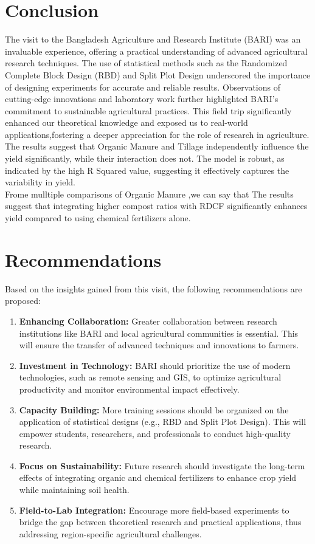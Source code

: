 \documentclass[oneside,12pt,fleqn]{book}
\begin{document}
\section{Conclusion}
The visit to the Bangladesh Agriculture and Research Institute (BARI) was an invaluable experience, offering a practical understanding of advanced agricultural research techniques. The use of statistical methods such as the Randomized Complete Block Design (RBD) and Split Plot Design underscored the importance of designing experiments for accurate and reliable results. Observations of cutting-edge innovations and laboratory work further highlighted BARI’s commitment to sustainable agricultural practices. This field trip significantly enhanced our theoretical knowledge and exposed us to real-world applications,fostering a deeper appreciation for the role of research in agriculture.\\
The results suggest that Organic Manure and Tillage independently influence the yield significantly, while their interaction does not. The model is robust, as indicated by the high R Squared value, suggesting it effectively captures the variability in yield.\\
Frome mulltiple comparisons of Organic Manure ,we can say that The results suggest that integrating higher compost ratios with RDCF significantly
enhances yield compared to using chemical fertilizers alone.



\section{Recommendations}
Based on the insights gained from this visit, the following recommendations are proposed:
\begin{enumerate}
    \item \textbf{Enhancing Collaboration:} Greater collaboration between research institutions like BARI and local agricultural communities is essential. This will ensure the transfer of advanced techniques and innovations to farmers.
    \item \textbf{Investment in Technology:} BARI should prioritize the use of modern technologies, such as remote sensing and GIS, to optimize agricultural productivity and monitor environmental impact effectively.
    \item \textbf{Capacity Building:} More training sessions should be organized on the application of statistical designs (e.g., RBD and Split Plot Design). This will empower students, researchers, and professionals to conduct high-quality research.
    \item \textbf{Focus on Sustainability:} Future research should investigate the long-term effects of integrating organic and chemical fertilizers to enhance crop yield while maintaining soil health.
    \item \textbf{Field-to-Lab Integration:} Encourage more field-based experiments to bridge the gap between theoretical research and practical applications, thus addressing region-specific agricultural challenges.
\end{enumerate}
\end{document}
